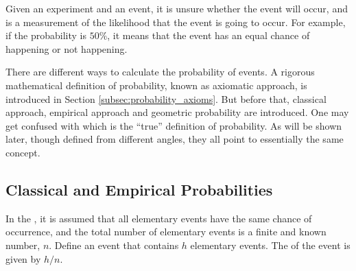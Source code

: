 Given an experiment and an event, it is unsure whether the event will occur, and  is a measurement of the likelihood that the event is going to occur. For example, if the probability is $50\%$, it means that the event has an equal chance of happening or not happening.

There are different ways to calculate the probability of events. A rigorous mathematical definition of probability, known as axiomatic approach, is introduced in Section \ref{subsec:probability_axioms}. But before that, classical approach, empirical approach and geometric probability are introduced. One may get confused with which is the ``true'' definition of probability. As will be shown later, though defined from different angles, they all point to essentially the same concept.

\subsection{Classical and Empirical Probabilities}

In the , it is assumed that all elementary events have the same chance of occurrence, and the total number of elementary events is a finite and known number, $n$. Define an event that contains $h$ elementary events. The  of the event is given by $h/n$.

